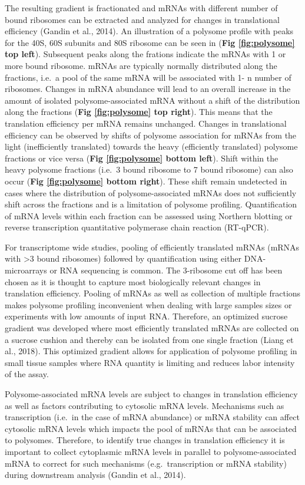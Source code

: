 \documentclass[12pt,openany]{book}
\begin{document}
The resulting gradient is fractionated and mRNAs with different number
of bound ribosomes can be extracted and analyzed for changes in
translational efficiency (Gandin et al., 2014). An illustration of a
polysome profile with peaks for the 40S, 60S subunits and 80S ribosome
can be seen in (\textbf{Fig \ref{fig:polysome} top left}). Subsequent
peaks along the frations indicate the mRNAs with 1 or more bound
ribosome. mRNAs are typically normally distributed along the fractions,
i.e.~a pool of the same mRNA will be associated with 1- n number of
ribosomes. Changes in mRNA abundance will lead to an overall increase in
the amount of isolated polysome-associated mRNA without a shift of the
distribution along the fractions (\textbf{Fig \ref{fig:polysome} top
right}). This means that the translation efficiency per mRNA remains
unchanged. Changes in translational efficiency can be observed by shifts
of polysome association for mRNAs from the light (inefficiently
translated) towards the heavy (efficiently translated) polysome
fractions or vice versa (\textbf{Fig \ref{fig:polysome} bottom left}).
Shift within the heavy polysome fractions (i.e.~3 bound ribosome to 7
bound ribosome) can also occur (\textbf{Fig \ref{fig:polysome} bottom
right}). These shift remain undetected in cases where the distribution
of polysome-associated mRNAs does not sufficiently shift across the
fractions and is a limitation of polysome profiling. Quantification of
mRNA levels within each fraction can be assessed using Northern blotting
or reverse transcription quantitative polymerase chain reaction
(RT-qPCR).

For transcriptome wide studies, pooling of efficiently translated mRNAs
(mRNAs with \textgreater{}3 bound ribosomes) followed by quantification
using either DNA-microarrays or RNA sequencing is common. The 3-ribosome
cut off has been chosen as it is thought to capture most biologically
relevant changes in translation efficiency. Pooling of mRNAs as well as
collection of multiple fractions makes polysome profiling inconvenient
when dealing with large samples sizes or experiments with low amounts of
input RNA. Therefore, an optimized sucrose gradient was developed where
most efficiently translated mRNAs are collected on a sucrose cushion and
thereby can be isolated from one single fraction (Liang et al., 2018).
This optimized gradient allows for application of polysome profiling in
small tissue samples where RNA quantity is limiting and reduces labor
intensity of the assay.

Polysome-associated mRNA levels are subject to changes in translation
efficiency as well as factors contributing to cytosolic mRNA levels.
Mechanisms such as transcription (i.e.~in the case of mRNA abundance) or
mRNA stability can affect cytosolic mRNA levels which impacts the pool
of mRNAs that can be associated to polysomes. Therefore, to identify
true changes in translation efficiency it is important to collect
cytoplasmic mRNA levels in parallel to polysome-associated mRNA to
correct for such mechanisms (e.g.~transcription or mRNA stability)
during downstream analysis (Gandin et al., 2014).
\end{document}
